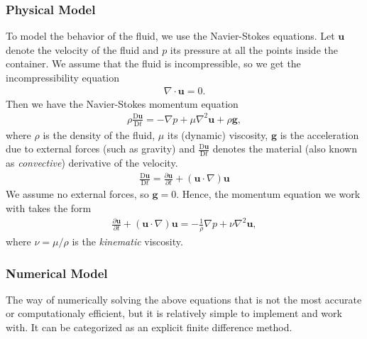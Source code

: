 \documentclass{article}
\newcommand{\vxlisp}{\vspace*{12pt}}
\begin{document}
\subsubsection{Physical Model}
To model the behavior of the fluid, we use the Navier-Stokes equations. Let $\mathbf u$ denote the velocity of the fluid and $p$ its pressure at all the points inside the container. We assume that the fluid is incompressible, so we get the incompressibility equation
\newcommand{\uu}{\mathbf u}
\newcommand{\D}{\mathrm D}
\begin{align}\label{eq:incom}
	\nabla\cdot\uu=0.
\end{align}
Then we have the Navier-Stokes momentum equation
\newcommand{\conv}{\frac{\D\uu}{\D t}}
\begin{align}
	\rho\conv=-\nabla p+\mu\nabla^2\uu+\rho\mathbf g,
\end{align}
where $\rho$ is the density of the fluid, $\mu$ its (dynamic) viscosity, $\mathbf g$ is the acceleration due to external forces (such as gravity) and $\conv$ denotes the material (also known as \emph{convective}) derivative of the velocity.
\newcommand{\pder}[2]{\frac{\partial #1}{\partial #2}}
\begin{align}
	\conv=\pder\uu t+(\uu\cdot\nabla)\uu
\end{align}
We assume no external forces, so $\mathbf g=0$. Hence, the momentum equation we work with takes the form
\begin{align}\label{eq:momentum}
	\pder\uu t+(\uu\cdot\nabla)\uu=-\frac1\rho\nabla p+\nu\nabla^2\uu,
\end{align}
where $\nu=\mu/\rho$ is the \emph{kinematic} viscosity.
\subsubsection{Numerical Model}
The way of numerically solving the above equations that is not the most accurate or computationaly efficient, but it is relatively simple to implement and work with. It can be categorized as an explicit finite difference method.
\vxlisp
\end{document}
